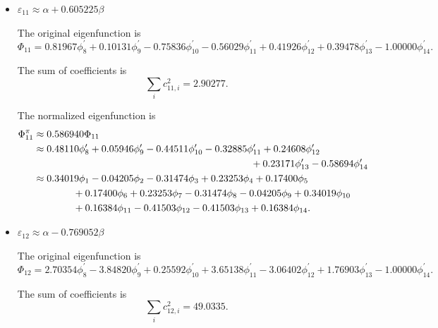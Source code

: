 \begin{itemize}
		
		\item $\varepsilon_{11} \approx \alpha + 0.605225 \beta$
		
		The original eigenfunction is
		\begin{equation*}
			\Phi_{11} = 0.81967 \phi^\prime_8 + 0.10131  \phi^\prime_9 - 0.75836  \phi^\prime_{10} -0.56029 \phi^\prime_{11} +0.41926 \phi^\prime_{12} +0.39478 \phi^\prime_{13} - 1.00000  \phi^\prime_{14}.
		\end{equation*}
		
		The sum of coefficients is
		\begin{equation*}
			\sum_{i} c^2_{11,i} =  2.90277.
		\end{equation*}
		
		The normalized eigenfunction is		
		\begin{align}
			\Phi^\pi_{11} &\approx 0.586940 \Phi_{11} \notag \\
			&\approx  0.48110 \phi^\prime_8 + 0.05946 \phi^\prime_9 -0.44511 \phi^\prime_{10} -0.32885 \phi^\prime_{11} + 0.24608  \phi^\prime_{12}  \notag\\
			&\hspace*{22em} +0.23171 \phi^\prime_{13} -0.58694 \phi^\prime_{14} \notag \\
			&\approx 0.34019 \phi_1 -0.04205 \phi_2  -0.31474 \phi_3  +0.23253 \phi_4 +0.17400  \phi_5  \notag \\
			&\hspace*{4em} +0.17400  \phi_6  +0.23253  \phi_7 -0.31474 \phi_8  -0.04205 \phi_9 +0.34019 \phi_{10} \notag \\
			&\hspace*{4em} +0.16384 \phi_{11} -0.41503  \phi_{12}   -0.41503 \phi_{13} +0.16384 \phi_{14} .
		\end{align}
		
		
		\item $\varepsilon_{12} \approx \alpha -0.769052 \beta$
		
		The original eigenfunction is
		\begin{equation*}
			\Phi_{12} = 2.70354 \phi^\prime_8 -3.84820 \phi^\prime_9 +0.25592 \phi^\prime_{10} +3.65138 \phi^\prime_{11}  -3.06402 \phi^\prime_{12} +1.76903 \phi^\prime_{13} -1.00000 \phi^\prime_{14}.
		\end{equation*}
		
		The sum of coefficients is
		\begin{equation*}
			\sum_{i} c^2_{12,i} = 49.0335.
		\end{equation*}
		

\end{itemize}

